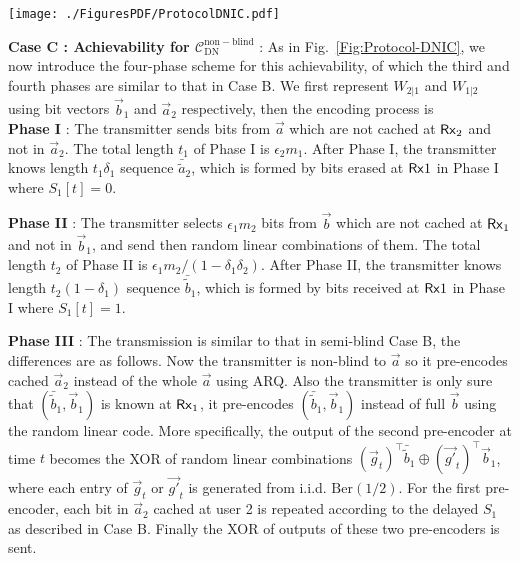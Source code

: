 \begin{figure*}
\texttt{[image: ./FiguresPDF/ProtocolDNIC.pdf]}
\caption{Proposed four-phase protocol for achieving $\mathcal{C}^{\mathrm{non-blind}}_{\mathrm{DN}}$.}\label{Fig:Protocol-DNIC}
\end{figure*}

\noindent \textbf{Case C : Achievability for $\mathcal{C}^{\mathrm{non-blind}}_{\mathrm{DN}}$} : As in Fig.~\ref{Fig:Protocol-DNIC}, we now introduce the four-phase scheme for this achievability, of which the third and fourth phases are similar to that in Case B. We first represent $W_{2|1}$ and $W_{1|2}$ using bit vectors $\vec{b}_1$ and $\vec{a}_2$ respectively, then the encoding process is \\
\noindent \textbf{Phase I} : The transmitter sends bits from $\vec{a}$ which are not cached at $\mathsf{Rx}_2$ and not in $\vec{a}_2$. The total length $t_1$ of Phase I is $\epsilon_2 m_1$. After Phase I, the transmitter knows length $t_1\delta_1$ sequence $\bar{\tilde{a}}_2$, which is formed by bits erased at $\mathsf{Rx}1$ in Phase I where $S_1[t]=0$.

\noindent \textbf{Phase II} : The transmitter selects $\epsilon_1 m_2$ bits from $\vec{b}$ which are not cached at $\mathsf{Rx}_1$ and not in $\vec{b}_1$, and send then random linear combinations of them.  The total length $t_2$ of Phase II is $\epsilon_1 m_2/(1-\delta_1\delta_2)$. After Phase II, the transmitter knows length $t_2(1-\delta_1)$ sequence $\bar{\tilde{b}}_1$, which is formed by bits received at $\mathsf{Rx}1$ in Phase I where $S_1[t]=1$.


\noindent \textbf{Phase III} : The transmission is similar to that in semi-blind Case B, the differences are as follows. Now the transmitter is non-blind to $\vec{a}$ so it pre-encodes cached $\vec{a}_2$ instead of the whole $\vec{a}$ using ARQ. Also the transmitter is only sure that  $(\bar{\tilde{b}}_1,\vec{b}_1)$ is known at $\mathsf{Rx}_1$, it pre-encodes $(\bar{\tilde{b}}_1,\vec{b}_1)$ instead of full $\vec{b}$ using the random linear code. More specifically, the output of the second pre-encoder at time $t$ becomes the XOR of random linear combinations $(\vec{g}_t)^\intercal \bar{\tilde{b}}_1 \oplus (\vec{g'}_t)^\intercal \vec{b}_1$, where each entry of $\vec{g}_t$ or $\vec{g'}_t$ is generated from i.i.d. $\mathrm{Ber}(1/2).$ For the first pre-encoder,  each bit in $\vec{a}_2$ cached at user 2 is
repeated according to the delayed $S_1$ as described in Case B. Finally the XOR of outputs of these two pre-encoders is sent.

